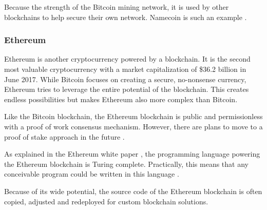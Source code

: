Because the strength of the Bitcoin mining network, it is used by other blockchains to help secure their own network. Namecoin is such an example \cite{namecoin-whitepaper}.

\subsubsection{Ethereum}

Ethereum is another cryptocurrency powered by a blockchain. It is the second most valuable cryptocurrency with a market capitalization of \$36.2 billion in June 2017. While Bitcoin focuses on creating a secure, no-nonsense currency, Ethereum tries to leverage the entire potential of the blockchain. This creates endless possibilities but makes Ethereum also more complex than Bitcoin.

Like the Bitcoin blockchain, the Ethereum blockchain is public and permissionless with a proof of work consensus mechanism. However, there are plans to move to a proof of stake approach in the future \cite{Ethereum-pos-faq}. 

As explained in the Ethereum white paper \cite{Ethereum-whitepaper}, the programming language powering the Ethereum blockchain is Turing complete. Practically, this means that any conceivable program could be written in this language \cite{definition-turing-completeness}.

Because of its wide potential, the source code of the Ethereum blockchain is often copied, adjusted and redeployed for custom blockchain solutions. 

